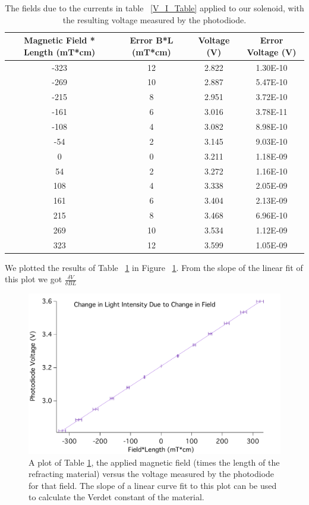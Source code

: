 \documentclass[prb,preprint]{revtex4-1}
\begin{document}
\begin{table}[h!]
\centering
\caption{The fields due to the currents in table ~\ref{V_I_Table} applied to our solenoid, with the resulting voltage measured by the photodiode. }
\begin{ruledtabular}
\begin{tabular}{c c c c}
Magnetic Field * Length (mT*cm) & Error B*L (mT*cm) & Voltage (V) & Error Voltage (V)\\
\hline	%
-323 & 12 & 2.822 & 1.30E-10 \\
-269 & 10 & 2.887 & 5.47E-10 \\
-215 & 8  & 2.951 & 3.72E-10 \\
-161 & 6  & 3.016 & 3.78E-11 \\
-108 & 4  & 3.082 & 8.98E-10 \\
-54  & 2  & 3.145 & 9.03E-10 \\
0    & 0  & 3.211 & 1.18E-09 \\
54   & 2  & 3.272 & 1.16E-10 \\
108  & 4  & 3.338 & 2.05E-09 \\
161  & 6  & 3.404 & 2.13E-09 \\
215  & 8  & 3.468 & 6.96E-10 \\
269  & 10 & 3.534 & 1.12E-09 \\
323  & 12 & 3.599 & 1.05E-09
\end{tabular}
\end{ruledtabular}
\label{V_B*L_Table}
\end{table}

We plotted the results of Table ~\ref{V_B*L_Table} in Figure ~\ref{V_B*L_Plot}. From the slope of the linear fit of this plot we got $\frac{\delta V}{\delta BL}$

\begin{figure}[h!]
\centering
\includegraphics[width=5in]{V_B-L_Plot.pdf}
\caption{A plot of Table \ref{V_B*L_Table}, the applied magnetic field (times the length of the refracting material) versus the voltage measured by the photodiode for that field. The slope of a linear curve fit to this plot can be used to calculate the Verdet constant of the material. }
\label{V_B*L_Plot}
\end{figure}
\end{document}
